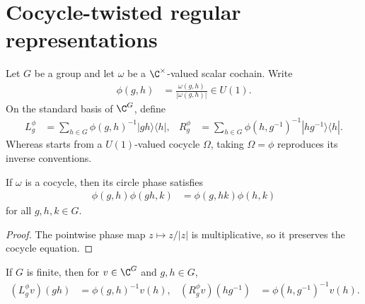 \section{Cocycle-twisted regular representations}
\label{sec:projective_twisted_regular}

\begin{definition}
    \label{def:mpug_twisted_regular_matrices}
    \leanok
    Let $G$ be a group and let $\omega$ be a $\C^\times$-valued scalar
    cochain.  Write
    \begin{align}
        \phi(g,h) & =\frac{\omega(g,h)}{|\omega(g,h)|}\in U(1).
    \end{align}
    On the standard basis of $\C^G$, define
    \begin{align}
        L_g^\phi
         & =\sum_{h\in G}\phi(g,h)^{-1}|gh\rangle\langle h|,
         &
        R_g^\phi
         & =\sum_{h\in G}\phi(h,g^{-1})^{-1}|hg^{-1}\rangle\langle h|.
        \label{eq:mpug_twisted_regular_matrices}
    \end{align}
    Whereas \cite[lines~412--418]{FrancoRubio2025MPUGauging} starts from a
    $U(1)$-valued cocycle $\Omega$, taking $\Omega=\phi$ reproduces its
    inverse conventions.
\end{definition}

\begin{lemma}
    \label{lem:mpug_circle_phase_cocycle}
    \leanok
    If $\omega$ is a cocycle, then its circle phase satisfies
    \begin{align}
        \phi(g,h)\phi(gh,k)
         & =\phi(g,hk)\phi(h,k)
    \end{align}
    for all $g,h,k\in G$.
\end{lemma}

\begin{proof}\leanok
    The pointwise phase map $z\mapsto z/|z|$ is multiplicative, so it preserves
    the cocycle equation.
\end{proof}

\begin{lemma}
    \label{thm:mpug_twisted_regular_action}
    \leanok
    If $G$ is finite, then for $v\in\C^G$ and $g,h\in G$,
    \begin{align}
        (L_g^\phi v)(gh)
         & =\phi(g,h)^{-1}v(h),
         &
        (R_g^\phi v)(hg^{-1})
         & =\phi(h,g^{-1})^{-1}v(h).
    \end{align}
\end{lemma}

